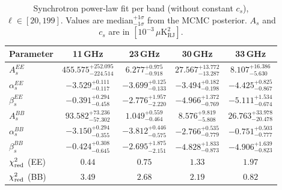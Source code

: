 \begin{table}[htbp]
\centering
\caption{Synchrotron power-law fit per band (without constant $c_s$), $\ell \in [20, 199]$. Values are median$^{+1\sigma}_{-1\sigma}$ from the MCMC posterior. $A_s$ and $c_s$ are in $[10^{-3}\,\mu\mathrm{K}^2_\mathrm{RJ}]$.}
\label{tab:sync_single_band_noc_ell20-199}
\begin{tabular}{lcccc}
\toprule
Parameter & 11\,GHz & 23\,GHz & 30\,GHz & 33\,GHz \\
\midrule
$A_s^{EE}$ & $455.575^{+252.095}_{-224.514}$ & $6.277^{+0.975}_{-0.918}$ & $27.567^{+13.772}_{-13.287}$ & $8.107^{+16.386}_{-5.630}$ \\
$\alpha_s^{EE}$ & $-3.529^{+0.111}_{-0.117}$ & $-3.699^{+0.125}_{-0.133}$ & $-3.494^{+0.182}_{-0.198}$ & $-4.425^{+0.825}_{-0.867}$ \\
$\beta_s^{EE}$ & $-0.391^{+0.294}_{-0.458}$ & $-2.776^{+1.957}_{-2.220}$ & $-4.966^{+1.372}_{-0.769}$ & $-5.111^{+1.534}_{-0.674}$ \\
\midrule
$A_s^{BB}$ & $93.582^{+73.236}_{-57.302}$ & $1.049^{+0.559}_{-0.464}$ & $8.576^{+9.819}_{-5.808}$ & $26.763^{+33.978}_{-20.478}$ \\
$\alpha_s^{BB}$ & $-3.150^{+0.294}_{-0.355}$ & $-3.812^{+0.446}_{-0.575}$ & $-2.766^{+0.535}_{-0.779}$ & $-0.751^{+0.503}_{-0.777}$ \\
$\beta_s^{BB}$ & $-0.424^{+0.308}_{-0.645}$ & $-2.695^{+1.875}_{-2.151}$ & $-4.828^{+1.833}_{-0.873}$ & $-4.906^{+1.639}_{-0.823}$ \\
\midrule
$\chi^2_{\rm red}$ (EE) & $0.44$ & $0.75$ & $1.33$ & $1.97$ \\
$\chi^2_{\rm red}$ (BB) & $3.49$ & $2.68$ & $2.19$ & $0.82$ \\
\bottomrule
\end{tabular}
\end{table}